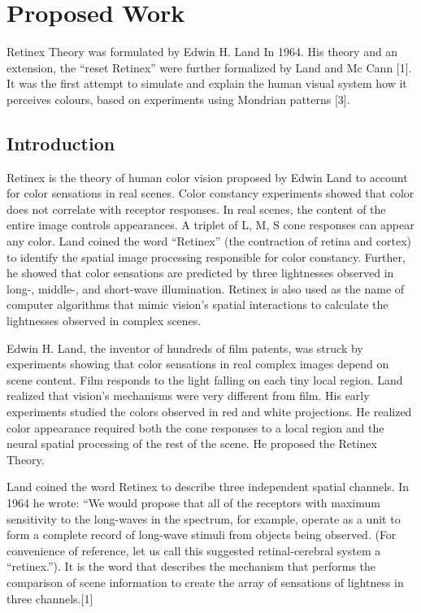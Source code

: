 \chapter{Proposed Work}
Retinex Theory was formulated by Edwin H. Land In 1964. His theory and an extension, the “reset Retinex” were further formalized by Land and Mc Cann [1]. It was the first attempt to simulate and explain the human visual system how it perceives colours, based on experiments using Mondrian patterns [3].
\section{Introduction}
Retinex is the theory of human color vision proposed by Edwin Land to account for color sensations in real scenes. Color constancy experiments showed that color does not correlate with receptor responses. In real scenes, the content of the entire image controls appearances. A triplet of L, M, S cone responses can appear any color. Land coined the word “Retinex” (the contraction of retina and cortex) to identify the spatial image processing responsible for color constancy. Further, he showed that color sensations are predicted by three lightnesses observed in long-, middle-, and short-wave illumination. Retinex is also used as the name of computer algorithms that mimic vision’s spatial interactions to calculate the lightnesses observed in complex scenes.

Edwin H. Land, the inventor of hundreds of film patents, was struck by experiments showing that color sensations in real complex images depend on scene content. Film responds to the light falling on each tiny local region. Land realized that vision’s mechanisms were very different from film. His early experiments studied the colors observed in red and white projections. He realized color appearance required both the cone responses to a local region and the neural spatial processing of the rest of the scene. He proposed the Retinex Theory.

Land coined the word Retinex to describe three independent spatial channels. In 1964 he wrote: “We would propose that all of the receptors with maximum sensitivity to the long-waves in the spectrum, for example, operate as a unit to form a complete record of long-wave stimuli from objects being observed. (For convenience of reference, let us call this suggested retinal-cerebral system a “retinex.”). It is the word that describes the mechanism that performs the comparison of scene information to create the array of sensations of lightness in three channels.[1]


